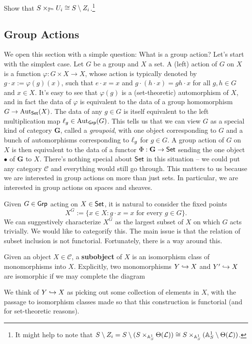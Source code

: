\documentclass[11pt]{article}
\newcommand{\CC}{\mathcal{C}}
\renewcommand{\L}{\mathcal{L}}
\renewcommand{\P}{\mathbb{P}}
\renewcommand{\phi}{\varphi}
\begin{document}
\begin{exercise}
Show that $S\times_{\P^n}U_i\iso S\setminus Z_i$.\footnote{It might help to note that $S\setminus Z_i=S\setminus(S\times_{\A_S^1}\Theta(\L))\iso S\times_{\A_S^1}(\A_S^1\setminus\Theta(\L))$.}
\end{exercise}

\subsection{Group Actions}
We open this section with a simple question: What is a group action? Let's start with the simplest case. Let $G$ be a group and $X$ a set. A (left) action of $G$ on $X$ is a function $\phi: G\times X\to X$, whose action is typically denoted by $g\cdot x:=\phi(g)(x)$, such that $e\cdot x=x$ and $g\cdot(h\cdot x)=gh\cdot x$ for all $g,h\in G$ and $x\in X$. It's easy to see that $\phi(g)$ is a (set-theoretic) automorphism of $X$, and in fact the data of $\phi$ is equivalent to the data of a group homomorphism $G\to\operatorname{Aut}_{\operatorname{\mathsf{Set}}}(X)$. The data of any $g\in G$ is itself equivalent to the left multiplication map $\ell_g\in\operatorname{Aut}_{\operatorname{\mathsf{Grp}}}(G)$. This tells us that we can view $G$ as a special kind of category $\mathbf{G}$, called a \emph{groupoid}, with one object corresponding to $G$ and a bunch of automorphisms corresponding to $\ell_g$ for $g\in G$. A group action of $G$ on $X$ is then equivalent to the data of a functor $\Phi: \mathbf{G}\to\operatorname{\mathsf{Set}}$ sending the one object $\bullet$ of $\mathbf{G}$ to $X$. There's nothing special about $\operatorname{\mathsf{Set}}$ in this situation -- we could put any category $\CC$ and everything would still go through. This matters to us because we are interested in group actions on more than just sets. In particular, we are interested in group actions on spaces and sheaves.

Given $G\in\operatorname{\mathsf{Grp}}$ acting on $X\in\operatorname{\mathsf{Set}}$, it is natural to consider the fixed points 
$$X^G:=\{x\in X : g\cdot x=x\textrm{ for every }g\in G\}.$$ 
We can suggestively characterize $X^G$ as the largest subset of $X$ on which $G$ acts trivially. We would like to categorify this. The main issue is that the relation of subset inclusion is not functorial. Fortunately, there is a way around this.

\begin{definition}
Given an object $X\in\CC$, a \textbf{subobject} of $X$ is an isomorphism class of monomorphisms into $X$. Explicitly, two monomorphisms $Y\hookrightarrow X$ and $Y'\hookrightarrow X$ are isomorphic if we may complete the diagram
\begin{center}
\end{center}
We think of $Y\hookrightarrow X$ as picking out some collection of elements in $X$, with the passage to isomorphism classes made so that this construction is functorial (and for set-theoretic reasons).
\end{definition}
\end{document}
